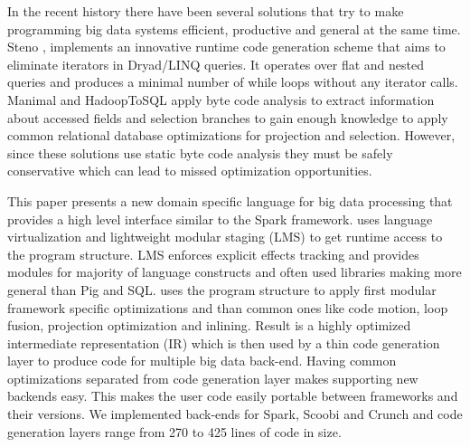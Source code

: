In the recent history there have been several solutions that try to make programming big data systems efficient, productive and general at the same time. Steno \cite{murray_steno:_2011}, implements an innovative runtime code generation scheme that aims to eliminate iterators in Dryad/LINQ queries. It operates over flat and nested queries and produces a minimal number of while loops without any iterator calls. Manimal \cite{jahani_automatic_2011} and HadoopToSQL \cite{iu_hadooptosql:_2010} apply byte code analysis to extract information about accessed fields and selection branches to gain enough knowledge to apply common relational database optimizations for projection and selection. However, since these solutions use static byte code analysis they must be safely conservative which can lead to missed optimization opportunities.         

This paper presents a new domain specific language \tool for big data processing that provides a high level interface similar to the Spark framework. \tool uses language virtualization \cite{moors_scala-virtualized_2012} and lightweight modular staging (LMS)\cite{rompf_lightweight_2010} to get runtime access to the program structure. LMS enforces explicit effects tracking and provides modules for majority of language constructs and often used libraries making \tool more general than Pig and SQL. \tool uses the program structure to apply first modular framework specific optimizations and than common ones like code motion, loop fusion, projection optimization and inlining. Result is a highly optimized intermediate representation (IR) which is then used by a thin code generation layer to produce code for multiple big data back-end. Having common optimizations separated from code generation layer makes supporting new backends  easy. This makes the user code easily portable between frameworks and their versions. We implemented back-ends for Spark, Scoobi \cite{nicta_scoobi_2012} and Crunch \cite{_crunch_2012} and code generation layers range from 270 to 425 lines of code in size. 


